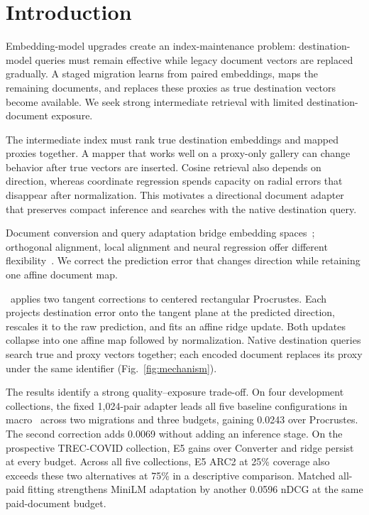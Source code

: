 \section{Introduction}
\label{sec:introduction}
Embedding-model upgrades create an index-maintenance problem: destination-model queries must remain effective while legacy document vectors are replaced gradually. A staged migration learns from paired embeddings, maps the remaining documents, and replaces these proxies as true destination vectors become available. We seek strong intermediate retrieval with limited destination-document exposure.

The intermediate index must rank true destination embeddings and mapped proxies together. A mapper that works well on a proxy-only gallery can change behavior after true vectors are inserted. Cosine retrieval also depends on direction, whereas coordinate regression spends capacity on radial errors that disappear after normalization. This motivates a directional document adapter that preserves compact inference and searches with the native destination query.

Document conversion and query adaptation bridge embedding spaces~\cite{embeddingconverter,driftadapter}; orthogonal alignment, local alignment and neural regression offer different flexibility~\cite{la2m,simplelinear}. We correct the prediction error that changes direction while retaining one affine document map.

\method\ applies two tangent corrections to centered rectangular Procrustes. Each projects destination error onto the tangent plane at the predicted direction, rescales it to the raw prediction, and fits an affine ridge update. Both updates collapse into one affine map followed by normalization. Native destination queries search true and proxy vectors together; each encoded document replaces its proxy under the same identifier (Fig.~\ref{fig:mechanism}).

The results identify a strong quality--exposure trade-off. On four development collections, the fixed 1,024-pair adapter leads all five baseline configurations in macro \ndcg\ across two migrations and three budgets, gaining 0.0243 over Procrustes. The second correction adds 0.0069 without adding an inference stage. On the prospective TREC-COVID collection, E5 gains over Converter and ridge persist at every budget. Across all five collections, E5 ARC2 at 25\% coverage also exceeds these two alternatives at 75\% in a descriptive comparison. Matched all-paid fitting strengthens MiniLM adaptation by another 0.0596 nDCG at the same paid-document budget.

